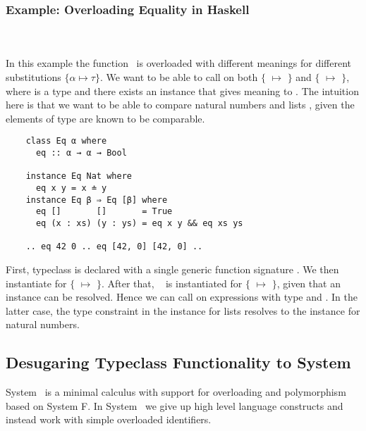 \subsubsection{Example: Overloading Equality in Haskell}\hfill\\\\
In this example the function \ is overloaded with different meanings for different substitutions $\{α \mapsto τ\}$. 
We want to be able to call  on both $\{$ $\mapsto$ $\}$ and $\{$ $\mapsto$ \inl{[β]}$\}$, where  is a type and there exists an instance that gives meaning to . The intuition here is that we want to be able to compare natural numbers  and lists \mono{[β]}, given the elements of type  are known to be comparable.
\begin{verbatim}
    class Eq α where
      eq :: α → α → Bool 

    instance Eq Nat where
      eq x y = x ≐ y
    instance Eq β ⇒ Eq [β] where
      eq []       []       = True
      eq (x : xs) (y : ys) = eq x y && eq xs ys 

    .. eq 42 0 .. eq [42, 0] [42, 0] ..
\end{verbatim}
First, typeclass  is declared with a single generic function signature . 
We then instantiate  for $\{$ $\mapsto$ $\}$. 
After that, \  is instantiated for $\{$ $\mapsto$ \inl{[β]}$\}$, given that an instance  can be resolved.
Hence we can call  on expressions with type  and \inl{[Nat]}. 
In the latter case, the type constraint  in the instance for lists resolves to the instance for natural numbers.

\subsection{Desugaring Typeclass Functionality to System \Fo}
System \Fo\ is a minimal calculus with support for overloading and polymorphism based on System F.  
In System \Fo\ we give up high level language constructs and instead work with simple overloaded identifiers. 

